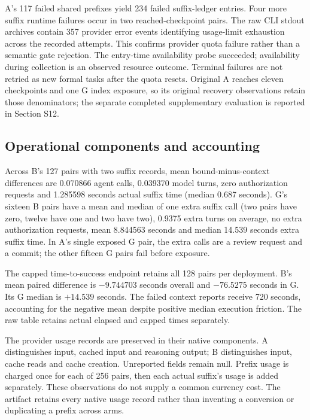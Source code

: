 \documentclass[11pt,a4paper]{article}
\begin{document}
A's 117 failed shared prefixes yield 234 failed suffix-ledger entries. Four more suffix runtime failures occur in two reached-checkpoint pairs. The raw CLI stdout archives contain 357 provider error events identifying usage-limit exhaustion across the recorded attempts. This confirms provider quota failure rather than a semantic gate rejection. The entry-time availability probe succeeded; availability during collection is an observed resource outcome. Terminal failures are not retried as new formal tasks after the quota resets. Original A reaches eleven checkpoints and one G index exposure, so its original recovery observations retain those denominators; the separate completed supplementary evaluation is reported in Section S12.

\subsection{Operational components and accounting}
Across B's 127 pairs with two suffix records, mean bound-minus-context differences are 0.070866 agent calls, 0.039370 model turns, zero authorization requests and 1.285598 seconds actual suffix time (median 0.687 seconds). G's sixteen B pairs have a mean and median of one extra suffix call (two pairs have zero, twelve have one and two have two), 0.9375 extra turns on average, no extra authorization requests, mean 8.844563 seconds and median 14.539 seconds extra suffix time. In A's single exposed G pair, the extra calls are a review request and a commit; the other fifteen G pairs fail before exposure.

The capped time-to-success endpoint retains all 128 pairs per deployment. B's mean paired difference is $-9.744703$ seconds overall and $-76.5275$ seconds in G. Its G median is $+14.539$ seconds. The failed context reports receive 720 seconds, accounting for the negative mean despite positive median execution friction. The raw table retains actual elapsed and capped times separately.

The provider usage records are preserved in their native components. A distinguishes input, cached input and reasoning output; B distinguishes input, cache reads and cache creation. Unreported fields remain null. Prefix usage is charged once for each of 256 pairs, then each actual suffix's usage is added separately. These observations do not supply a common currency cost. The artifact retains every native usage record rather than inventing a conversion or duplicating a prefix across arms.
\end{document}
